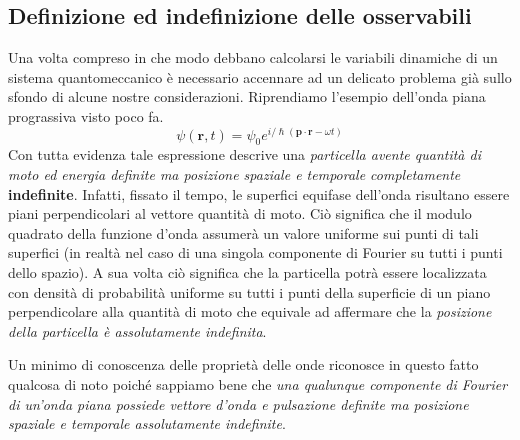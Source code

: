 \subsection{Definizione ed indefinizione delle osservabili}
\label{sec:definizione-ed-indefinizione-delle-osservabili}

Una volta compreso in che modo debbano calcolarsi le variabili dinamiche
di un sistema quantomeccanico è necessario accennare ad un delicato
problema già sullo sfondo di alcune nostre considerazioni.
Riprendiamo
l'esempio dell'onda piana prograssiva visto poco fa. \[
	\psi(\bm{r},t) = \psi_{0}e^{ i/\hslash (\bm{p}\cdot \bm{r}- \omega t)}
\] Con tutta evidenza tale espressione descrive una \emph{particella avente
quantità di moto ed energia definite ma posizione spaziale e temporale
completamente} \textbf{indefinite}.
Infatti, fissato il tempo, le
superfici equifase dell'onda risultano essere piani perpendicolari al
vettore quantità di moto.
Ciò significa che il modulo quadrato della
funzione d'onda assumerà un valore uniforme sui punti di tali superfici
(in realtà nel caso di una singola componente di Fourier su tutti i
punti dello spazio).
A sua volta ciò significa che la particella potrà
essere localizzata con densità di probabilità uniforme su tutti i punti
della superficie di un piano perpendicolare alla quantità di moto che
equivale ad affermare che la \emph{posizione della particella è assolutamente
indefinita}.

Un minimo di conoscenza delle proprietà delle onde riconosce in questo
fatto qualcosa di noto poiché sappiamo bene che \emph{una qualunque
	componente di Fourier di un'onda piana possiede vettore d'onda e
	pulsazione definite ma posizione spaziale e temporale assolutamente
	indefinite}.

